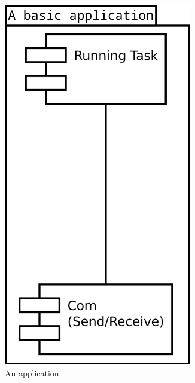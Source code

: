 \begin{figure}[h]
    \begin{subfigure}[b]{0.5\linewidth}
        \centering
            \includegraphics[width=0.9\textwidth]{figures/iteration2_uml_basic_application}
            \caption{An application}
            \label{fig:iteration2_uml_basic_application}
            \end{subfigure}%
        \begin{subfigure}[b]{.5\linewidth}
            \centering

\end{subfigure}
\end{figure}

